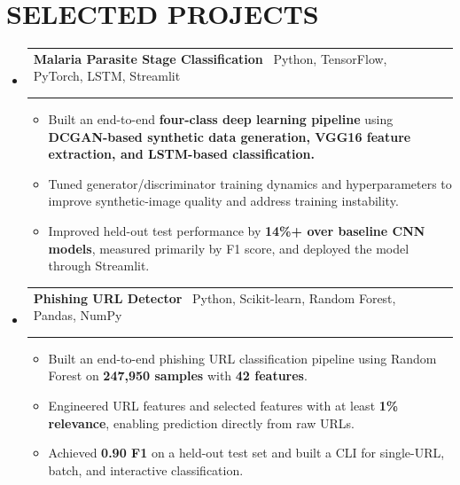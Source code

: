 \documentclass[11pt,a4paper]{article}
\makeatletter
\newcommand{\resumeProjectHeading}[4]{
  \vspace{2pt}
  \item[]
    \begin{tabular*}{\textwidth}[t]{@{\hspace{0pt}}p{0.82\textwidth}@{\extracolsep{\fill}}r}
      \textbf{#1} {\small\textbar\ #2} & \textit{#3} \\
      \if\relax\detokenize{#4}\relax\else
        \multicolumn{2}{l}{\footnotesize\color{gray!70}\faGithub\ \href{#4}{#4}} \\
      \fi
    \end{tabular*}
  \vspace{-12pt}
}
\makeatother
\begin{document}
\vspace{-12pt}

\section{SELECTED PROJECTS}

\begin{itemize}[leftmargin=0pt, label={}]

\resumeProjectHeading
    {Malaria Parasite Stage Classification}{Python, TensorFlow, PyTorch, LSTM, Streamlit}{}{}
    \begin{itemize} [leftmargin=15pt, label=\textbullet]
    \item Built an end-to-end \textbf{four-class deep learning pipeline} using \textbf{DCGAN-based synthetic data generation, VGG16 feature extraction, and LSTM-based classification.}
    \item Tuned generator/discriminator training dynamics and hyperparameters to improve synthetic-image quality and address training instability.
    \item Improved held-out test performance by \textbf{14\%+ over baseline CNN models}, measured primarily by F1 score, and deployed the model through Streamlit.
    \end{itemize}

\resumeProjectHeading
    {Phishing URL Detector}{Python, Scikit-learn, Random Forest, Pandas, NumPy}{}{https://github.com/DejusDevspace/phishing-detector-ml-cli-toolkit}
    \begin{itemize} [leftmargin=15pt, label=\textbullet]
    \item Built an end-to-end phishing URL classification pipeline using Random Forest on \textbf{247,950 samples} with \textbf{42 features}.
    \item Engineered URL features and selected features with at least \textbf{1\% relevance}, enabling prediction directly from raw URLs.
    \item Achieved \textbf{0.90 F1} on a held-out test set and built a CLI for single-URL, batch, and interactive classification.
    \end{itemize}


\end{itemize}
\end{document}
